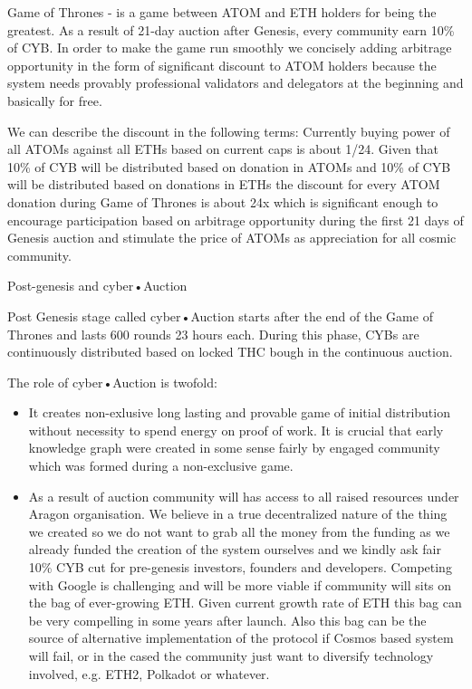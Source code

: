 \documentclass[10pt,oneside]{amsart}
\makeatletter
\def\section{\@startsection{section}{1}%
  \z@{.7\linespacing\@plus\linespacing}{.5\linespacing}%
  {\normalfont\scshape}}%
\makeatother
\begin{document}
Game of Thrones - is a game between ATOM and ETH holders for being the greatest. As a result of 21-day auction after Genesis, every community earn 10\% of CYB. In order to make the game run smoothly we concisely adding arbitrage opportunity in the form of significant discount to ATOM holders because the system needs provably professional validators and delegators at the beginning and basically for free.

We can describe the discount in the following terms: Currently buying power of all ATOMs against all ETHs based on current caps is about 1/24. Given that 10\% of CYB will be distributed based on donation in ATOMs and 10\% of CYB will be distributed based on donations in ETHs the discount for every ATOM donation during Game of Thrones is about 24x which is significant enough to encourage participation based on arbitrage opportunity during the first 21 days of Genesis auction and stimulate the price of ATOMs as appreciation for all cosmic community.

\section{Post-genesis and cyber•Auction}\label{Post-genesis and cyberAuction}

Post Genesis stage called cyber•Auction starts after the end of the Game of Thrones and lasts 600 rounds 23 hours each. During this phase, CYBs are continuously distributed based on locked THC bough in the continuous auction.

The role of cyber•Auction is twofold:

\begin{itemize}
\item  It creates non-exlusive long lasting and provable game of initial distribution without necessity to spend energy on proof of work. It is crucial that early knowledge graph were created in some sense fairly by engaged community which was formed during a non-exclusive game.
\item  As a result of auction community will has access to all raised resources under Aragon organisation. We believe in a true decentralized nature of the thing we created so we do not want to grab all the money from the funding as we already funded the creation of the system ourselves and we kindly ask fair 10\% CYB cut for pre-genesis investors, founders and developers. Competing with Google is challenging and will be more viable if community will sits on the bag of ever-growing ETH. Given current growth rate of ETH this bag can be very compelling in some years after launch. Also this bag can be the source of alternative implementation of the protocol if Cosmos based system will fail, or in the cased the community just want to diversify technology involved, e.g. ETH2, Polkadot or whatever.
\end{itemize}
\end{document}
